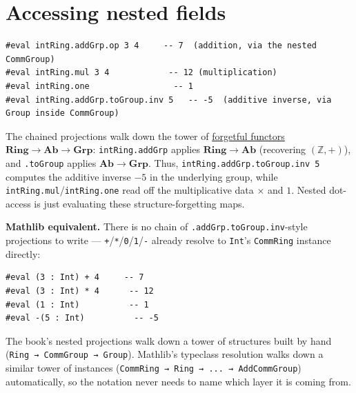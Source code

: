 \section{Accessing nested fields}\label{sec:08-rings:06-accessing-fields:1}

\begin{lstlisting}
#eval intRing.addGrp.op 3 4     -- 7  (addition, via the nested CommGroup)
#eval intRing.mul 3 4            -- 12 (multiplication)
#eval intRing.one                 -- 1
#eval intRing.addGrp.toGroup.inv 5   -- -5  (additive inverse, via Group inside CommGroup)
\end{lstlisting}

\begin{mathreading}

The chained projections walk down the tower of \hyperref[sec:01-basics:04-terminology:1]{forgetful functors} \(\mathbf{Ring} \to \mathbf{Ab} \to \mathbf{Grp}\): \texttt{intRing.addGrp} applies \(\mathbf{Ring}\to\mathbf{Ab}\) (recovering \((\mathbb{Z},
+)\)), and \texttt{.toGroup} applies \(\mathbf{Ab}\to\mathbf{Grp}\). Thus, \texttt{intRing.addGrp.toGroup.inv 5} computes the additive inverse \(-5\) in the underlying group, while \texttt{intRing.mul}/\texttt{intRing.one} read off the multiplicative data \(\times\) and \(1\). Nested dot-access is just evaluating these structure-forgetting maps.

\end{mathreading}

\textbf{Mathlib equivalent.} There is no chain of \texttt{.addGrp.toGroup.inv}-style projections to write --- \texttt{+}/\texttt{*}/\texttt{0}/\texttt{1}/\texttt{-} already resolve to \texttt{Int}'s \texttt{CommRing} instance directly:

\begin{lstlisting}
#eval (3 : Int) + 4     -- 7
#eval (3 : Int) * 4      -- 12
#eval (1 : Int)          -- 1
#eval -(5 : Int)          -- -5
\end{lstlisting}

The book's nested projections walk down a tower of structures built by hand (\texttt{Ring → CommGroup → Group}). Mathlib's typeclass resolution walks down a similar tower of instances (\texttt{CommRing → Ring → ... → AddCommGroup}) automatically, so the notation never needs to name which layer it is coming from.
